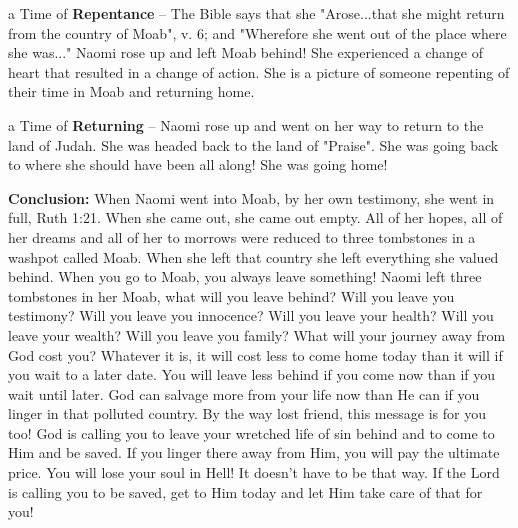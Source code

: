 \begin{compactenum}[I.][7]
\begin{compactenum}[A.][7]
   		\item a Time of \textbf{Repentance}  -- The Bible says that she "Arose...that she might return from the country of Moab", v. 6; and "Wherefore she went out of the place where she was..." Naomi rose up and left Moab behind! She experienced a change of heart that resulted in a change of action. She is a picture of someone repenting of their time in Moab and returning home.
   		\item a Time of \textbf{Returning}  -- Naomi rose up and went on her way to return to the land of Judah. She was headed back to the land of "Praise". She was going back to where she should have been all along! She was going home!
   \end{compactenum}
\end{compactenum}
\textbf{Conclusion: }When Naomi went into Moab, by her own testimony, she went in full, Ruth 1:21. When she came out, she came out empty. All of her hopes, all of her dreams and all of her to morrows were reduced to three tombstones in a washpot called Moab. When she left that country she left everything she valued behind. When you go to Moab, you always leave something! Naomi left three tombstones in her Moab, what will you leave behind? Will you leave you testimony? Will you leave you innocence? Will you leave your health? Will you leave your wealth? Will you leave you family? What will your journey away from God cost you? Whatever it is, it will cost less to come home today than it will if you wait to a later date. You will leave less behind if you come now than if you wait until later. God can salvage more from your life now than He can if you linger in that polluted country. By the way lost friend, this message is for you too! God is calling you to leave your wretched life of sin behind and to come to Him and be saved. If you linger there away from Him, you will pay the ultimate price. You will lose your soul in Hell! It doesn't have to be that way. If the Lord is calling you to be saved, get to Him today and let Him take care of that for you!


